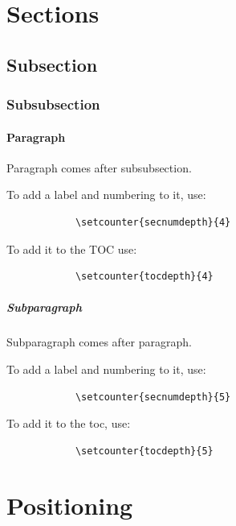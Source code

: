 \documentclass[12pt]{article}
\begin{document}
\section{Sections}\label{sections}

  \subsection{Subsection}\label{subsection}

    \subsubsection{Subsubsection}\label{subsubsection}

      \paragraph{Paragraph}\label{paragraph}

          Paragraph comes after subsubsection.

          To add a label and numbering to it, use:

          \begin{lstlisting}
            \setcounter{secnumdepth}{4}
          \end{lstlisting}

          To add it to the TOC use:

          \begin{lstlisting}
            \setcounter{tocdepth}{4}
          \end{lstlisting}

        \subparagraph{Subparagraph}\label{subparagraph}

          Subparagraph comes after paragraph.

          To add a label and numbering to it, use:

          \begin{lstlisting}
            \setcounter{secnumdepth}{5}
          \end{lstlisting}

          To add it to the toc, use:

          \begin{lstlisting}
            \setcounter{tocdepth}{5}
          \end{lstlisting}

\section{Positioning}\label{positioning}
\end{document}
